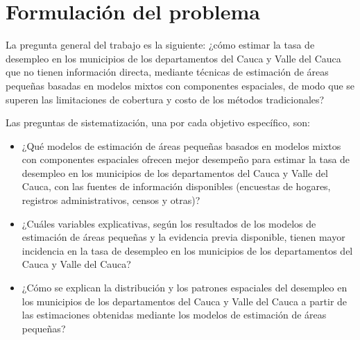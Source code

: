 \section{Formulación del problema}
\label{sec:formulacion}

La pregunta general del trabajo es la siguiente: ¿cómo estimar la tasa de desempleo en los municipios de los departamentos del Cauca y Valle del Cauca que no tienen información directa, mediante técnicas de estimación de áreas pequeñas basadas en modelos mixtos con componentes espaciales, de modo que se superen las limitaciones de cobertura y costo de los métodos tradicionales?

Las preguntas de sistematización, una por cada objetivo específico, son:

\begin{itemize}
    \item ¿Qué modelos de estimación de áreas pequeñas basados en modelos mixtos con componentes espaciales ofrecen mejor desempeño para estimar la tasa de desempleo en los municipios de los departamentos del Cauca y Valle del Cauca, con las fuentes de información disponibles (encuestas de hogares, registros administrativos, censos y otras)?

    \item ¿Cuáles variables explicativas, según los resultados de los modelos de estimación de áreas pequeñas y la evidencia previa disponible, tienen mayor incidencia en la tasa de desempleo en los municipios de los departamentos del Cauca y Valle del Cauca?

    \item ¿Cómo se explican la distribución y los patrones espaciales del desempleo en los municipios de los departamentos del Cauca y Valle del Cauca a partir de las estimaciones obtenidas mediante los modelos de estimación de áreas pequeñas?
\end{itemize}
